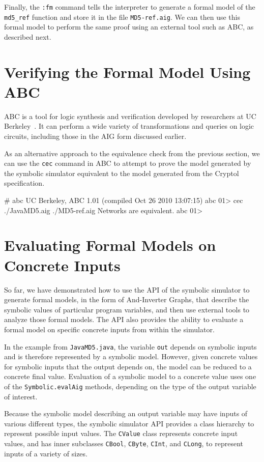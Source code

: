 \documentclass[11pt]{article}
\begin{document}
Finally, the \texttt{:fm} command tells the interpreter to generate a
formal model of the \texttt{md5\_ref} function and store it in the
file \texttt{MD5-ref.aig}. We can then use this formal model to
perform the same proof using an external tool such as ABC, as
described next.

\section{Verifying the Formal Model Using ABC}

ABC is a tool for logic synthesis and verification developed by
researchers at UC Berkeley~\cite{abc}. It can perform a wide variety
of transformations and queries on logic circuits, including those in
the AIG form discussed earlier.

As an alternative approach to the equivalence check from the previous
section, we can use the \texttt{cec} command in ABC to attempt to
prove the model generated by the symbolic simulator equivalent to the
model generated from the Cryptol specification.

\begin{code}
# abc
UC Berkeley, ABC 1.01 (compiled Oct 26 2010 13:07:15)
abc 01> cec ./JavaMD5.aig ./MD5-ref.aig
Networks are equivalent.
abc 01> 
\end{code}

\section{Evaluating Formal Models on Concrete Inputs}

So far, we have demonstrated how to use the API of the symbolic
simulator to generate formal models, in the form of And-Inverter
Graphs, that describe the symbolic values of particular program
variables, and then use external tools to analyze those formal models.
The API also provides the ability to evaluate a formal model on
specific concrete inputs from within the simulator.

In the example from \texttt{JavaMD5.java}, the variable \texttt{out}
depends on symbolic inputs and is therefore represented by a symbolic
model. However, given concrete values for symbolic inputs that the
output depends on, the model can be reduced to a concrete final value.
Evaluation of a symbolic model to a concrete value uses one of the
\texttt{Symbolic.evalAig} methods, depending on the type of the output
variable of interest.

Because the symbolic model describing an output variable may have
inputs of various different types, the symbolic simulator API provides
a class hierarchy to represent possible input values. The
\texttt{CValue} class represents concrete input values, and has inner
subclasses \texttt{CBool}, \texttt{CByte}, \texttt{CInt}, and
\texttt{CLong}, to represent inputs of a variety of sizes.
\end{document}
